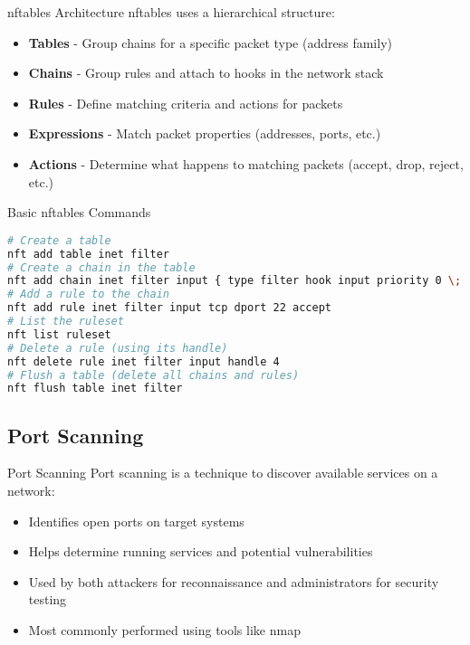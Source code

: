 \begin{concept}{nftables Architecture}
nftables uses a hierarchical structure:
\begin{itemize}
    \item \textbf{Tables} - Group chains for a specific packet type (address family)
    \item \textbf{Chains} - Group rules and attach to hooks in the network stack
    \item \textbf{Rules} - Define matching criteria and actions for packets
    \item \textbf{Expressions} - Match packet properties (addresses, ports, etc.)
    \item \textbf{Actions} - Determine what happens to matching packets (accept, drop, reject, etc.)
\end{itemize}
\end{concept}

\begin{code}{Basic nftables Commands}
\begin{lstlisting}[language=bash, style=basesmol]
# Create a table
nft add table inet filter
# Create a chain in the table
nft add chain inet filter input { type filter hook input priority 0 \; policy drop \; }
# Add a rule to the chain
nft add rule inet filter input tcp dport 22 accept
# List the ruleset
nft list ruleset
# Delete a rule (using its handle)
nft delete rule inet filter input handle 4
# Flush a table (delete all chains and rules)
nft flush table inet filter
\end{lstlisting}
\end{code}


\subsection{Port Scanning}

\begin{definition}{Port Scanning}
Port scanning is a technique to discover available services on a network:
\begin{itemize}
    \item Identifies open ports on target systems
    \item Helps determine running services and potential vulnerabilities
    \item Used by both attackers for reconnaissance and administrators for security testing
    \item Most commonly performed using tools like nmap
\end{itemize}
\end{definition}

